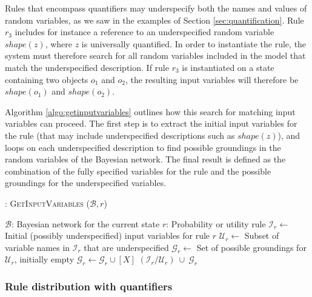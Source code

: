 Rules that encompass quantifiers may underspecify both the names and values of random variables, as we saw in the examples of Section \ref{sec:quantification}.  Rule $r_3$ includes for instance a reference to an underspecified random variable $\mathit{shape}(z)$, where $z$ is universally quantified.  In order to instantiate the rule, the system must therefore search for all random variables included in the model that match the underspecified description. If rule $r_3$ is instantiated on a state containing two objects $o_1$ and $o_2$, the resulting input variables will therefore be $\mathit{shape}(o_1)$ and $\mathit{shape}(o_2)$. 

Algorithm \ref{algo:getinputvariables} outlines how this search for matching input variables can proceed. The first step is to extract the initial input variables for the rule (that may include underspecified descriptions such as $\mathit{shape}(z)$), and loops on each underspecified description to find possible groundings in the random variables of the Bayesian network.  The final result is defined as the combination of the fully specified variables for the rule and the possible groundings for the underspecified variables. 

\begin{algorithm}[h!]
\caption{: \textsc{GetInputVariables} ($\mathcal{B}, r$)}
\begin{algorithmic}[1] \vspace{1mm}
\REQUIRE $\mathcal{B}$: Bayesian network for the current state
\REQUIRE $r$: Probability or utility rule  \vspace{1mm}
\STATE $\mathcal{I}_{r} \leftarrow $ Initial (possibly underspecified) input variables for rule $r$
\STATE $\mathcal{U}_{r} \leftarrow $ Subset of variable names in $\mathcal{I}_{r}$ that are underspecified
\STATE $\mathcal{G}_{r} \leftarrow$ Set of possible groundings for $\mathcal{U}_{r}$, initially empty
\STATE $\mathcal{G}_{r} \leftarrow \mathcal{G}_{r} \cup [X]$
\ENDIF
\ENDFOR
\ENDFOR
\RETURN $(\mathcal{I}_{r} / \mathcal{U}_{r}) \ \cup \  \mathcal{G}_{r}$
\end{algorithmic}
\label{algo:getinputvariables}
\end{algorithm}

\subsubsection*{Rule distribution with quantifiers}

